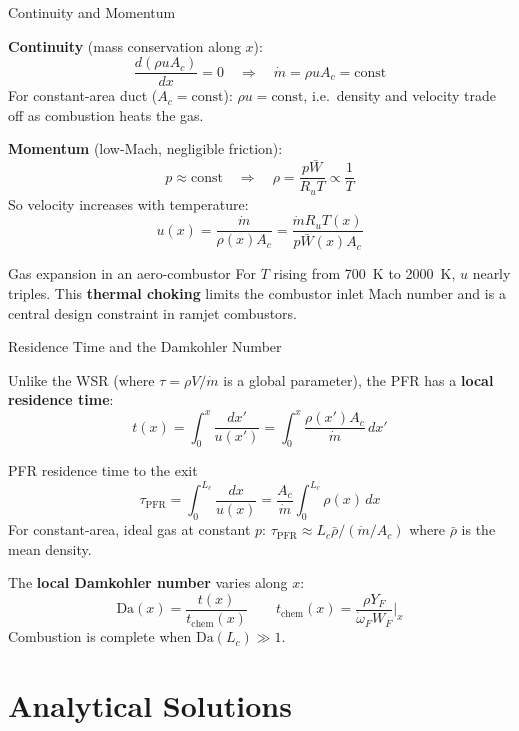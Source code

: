 \documentclass[12pt,aspectratio=169]{beamer}
\newcommand{\tchem}{t_{\text{chem}}}
\newcommand{\Da}{\mathrm{Da}}
\newcommand{\ddx}[1]{\frac{d#1}{dx}}
\newcommand{\mdot}{\dot{m}}
\newcommand{\Ac}{A_c}
\newcommand{\taupfr}{\tau_{\text{PFR}}}
\newcommand{\wdot}{\dot{\omega}}
\begin{document}
\begin{frame}{Continuity and Momentum}

  \textbf{Continuity} (mass conservation along $x$):
  \[
    \ddx{(\rho u \Ac)} = 0
    \quad\Rightarrow\quad
    \mdot = \rho u \Ac = \text{const}
  \]
  For constant-area duct ($\Ac = \text{const}$):
  $\rho u = \text{const}$, i.e.\ density and velocity trade off
  as combustion heats the gas.

  \medskip
  \textbf{Momentum} (low-Mach, negligible friction):
  \[
    p \approx \text{const}
    \quad\Rightarrow\quad
    \rho = \frac{p\bar{W}}{R_u T} \propto \frac{1}{T}
  \]
  So velocity increases with temperature:
  \[
    u(x) = \frac{\mdot}{\rho(x)\Ac} = \frac{\mdot R_u T(x)}{p \bar{W}(x) \Ac}
  \]

  \begin{alertblock}{Gas expansion in an aero-combustor}
    For $T$ rising from 700~K to 2000~K, $u$ nearly triples.
    This \textbf{thermal choking} limits the combustor inlet Mach number
    and is a central design constraint in ramjet combustors.
  \end{alertblock}
\end{frame}

\begin{frame}{Residence Time and the Damkohler Number}

  Unlike the WSR (where $\tau = \rho V / \mdot$ is a global parameter),
  the PFR has a \textbf{local residence time}:
  \[
    t(x) = \int_0^x \frac{dx'}{u(x')}
    = \int_0^x \frac{\rho(x')\Ac}{\mdot}\,dx'
  \]

  \begin{block}{PFR residence time to the exit}
    \[
      \taupfr = \int_0^{L_c} \frac{dx}{u(x)}
      = \frac{\Ac}{\mdot}\int_0^{L_c}\rho(x)\,dx
    \]
    For constant-area, ideal gas at constant $p$:
    $\taupfr \approx L_c\bar\rho / (\mdot/\Ac)$
    where $\bar\rho$ is the mean density.
  \end{block}

  \medskip
  The \textbf{local Damkohler number} varies along $x$:
  \[
    \Da(x) = \frac{t(x)}{\tchem(x)}
    \qquad
    \tchem(x) = \frac{\rho Y_{F}}{\wdot_F W_F}\bigg|_x
  \]
  Combustion is complete when $\Da(L_c) \gg 1$.
\end{frame}

\section{Analytical Solutions}
\end{document}
